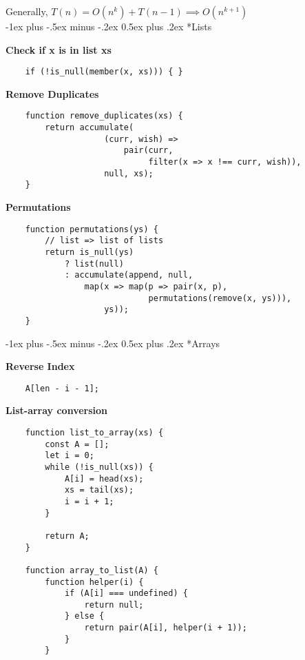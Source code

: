 \documentclass[10pt]{article}
\makeatletter
\renewcommand{\section}{\@startsection{section}{1}{0mm}%
                                {-1ex plus -.5ex minus -.2ex}%
                                {0.5ex plus .2ex}%
                                {\normalfont\large\bfseries}}
\makeatother
\begin{document}
\begin{multicols}{2}
Generally, $T(n) = O(n^k) + T(n-1)  \implies O(n^{k+1})$ \\

\hrulefill
\section*{Lists}

\textbf{ Check if x is in list xs}
\begin{verbatim}
    if (!is_null(member(x, xs))) { }
\end{verbatim}

\textbf{Remove Duplicates}
\begin{verbatim}
    function remove_duplicates(xs) {
        return accumulate(
                    (curr, wish) => 
                        pair(curr, 
                             filter(x => x !== curr, wish)),
                    null, xs);
    }
\end{verbatim}

\textbf{Permutations}
\begin{verbatim}
    function permutations(ys) {
        // list => list of lists
        return is_null(ys)
            ? list(null)
            : accumulate(append, null,
                map(x => map(p => pair(x, p),
                             permutations(remove(x, ys))),
                    ys));
    }
\end{verbatim}

\hrulefill

\section*{Arrays}

\textbf{ Reverse Index}
\begin{verbatim}
    A[len - i - 1];
\end{verbatim}

\textbf{List-array conversion}
\begin{verbatim}
    function list_to_array(xs) {
        const A = [];
        let i = 0;
        while (!is_null(xs)) {
            A[i] = head(xs);
            xs = tail(xs);
            i = i + 1;
        }
        
        return A;
    }
    
    function array_to_list(A) {
        function helper(i) {
            if (A[i] === undefined) {
                return null;
            } else {
                return pair(A[i], helper(i + 1));
            }
        }
        

\end{verbatim}
\end{multicols}
\end{document}

